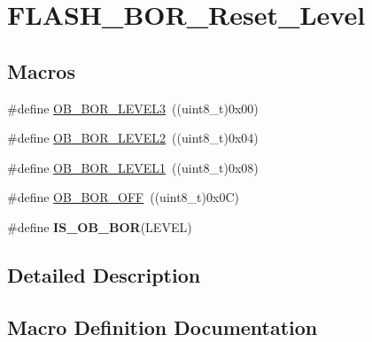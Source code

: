 \hypertarget{group___f_l_a_s_h___b_o_r___reset___level}{}\section{F\+L\+A\+S\+H\+\_\+\+B\+O\+R\+\_\+\+Reset\+\_\+\+Level}
\label{group___f_l_a_s_h___b_o_r___reset___level}
\subsection*{Macros}
\begin{DoxyCompactItemize}
\item 
\#define \hyperlink{group___f_l_a_s_h___b_o_r___reset___level_ga3132b8202c0a345e9dd33d136714b046}{O\+B\+\_\+\+B\+O\+R\+\_\+\+L\+E\+V\+E\+L3}~((uint8\+\_\+t)0x00)
\item 
\#define \hyperlink{group___f_l_a_s_h___b_o_r___reset___level_gad678e849fcf817f6ed2d837538e8ebc2}{O\+B\+\_\+\+B\+O\+R\+\_\+\+L\+E\+V\+E\+L2}~((uint8\+\_\+t)0x04)
\item 
\#define \hyperlink{group___f_l_a_s_h___b_o_r___reset___level_ga3a888b788e75f0bc1f9add85c9ccd9d6}{O\+B\+\_\+\+B\+O\+R\+\_\+\+L\+E\+V\+E\+L1}~((uint8\+\_\+t)0x08)
\item 
\#define \hyperlink{group___f_l_a_s_h___b_o_r___reset___level_gaabc231cb1d05a94fe860f67bb5a37b12}{O\+B\+\_\+\+B\+O\+R\+\_\+\+O\+F\+F}~((uint8\+\_\+t)0x0\+C)
\item 
\#define {\bfseries I\+S\+\_\+\+O\+B\+\_\+\+B\+O\+R}(L\+E\+V\+E\+L)
\end{DoxyCompactItemize}


\subsection{Detailed Description}


\subsection{Macro Definition Documentation}
\hypertarget{group___f_l_a_s_h___b_o_r___reset___level_ga1fbf304e1564edd30259c5ea069afc93}{}
